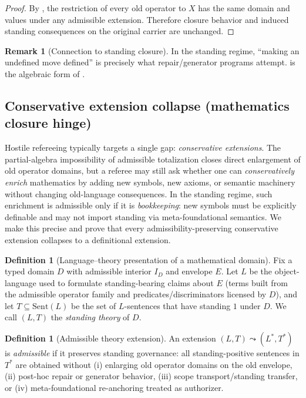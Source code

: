 \documentclass[11pt]{article}
\theoremstyle{definition}
\newtheorem{definition}[theorem]{Definition}
\newtheorem{remark}[theorem]{Remark}
\begin{document}
\begin{proof}
By , the restriction of every old operator to $X$ has the same domain and values under any admissible extension.
Therefore closure behavior and induced standing consequences on the original carrier are unchanged.
\end{proof}

\begin{remark}[Connection to standing closure]
In the standing regime, ``making an undefined move defined'' is precisely what repair/generator programs attempt.
 is the algebraic form of .
\end{remark}

\subsection{Conservative extension collapse (mathematics closure hinge)}
\label{sec:conservative}

Hostile refereeing typically targets a single gap: \emph{conservative extensions}.
The partial-algebra impossibility of admissible totalization closes direct enlargement of old operator domains, but a referee may still ask whether one can \emph{conservatively enrich} mathematics by adding new symbols, new axioms, or semantic machinery without changing old-language consequences.
In the standing regime, such enrichment is admissible only if it is \emph{bookkeeping}: new symbols must be explicitly definable and may not import standing via meta-foundational semantics.
We make this precise and prove that every admissibility-preserving conservative extension collapses to a definitional extension.

\begin{definition}[Language--theory presentation of a mathematical domain]
Fix a typed domain $D$ with admissible interior $I_D$ and envelope $E$.
Let $L$ be the object-language used to formulate standing-bearing claims about $E$ (terms built from the admissible operator family and predicates/discriminators licensed by $D$), and let
$T\subseteq \mathrm{Sent}(L)$ be the set of $L$-sentences that have standing $1$ under $D$.
We call $(L,T)$ the \emph{standing theory} of $D$.
\end{definition}

\begin{definition}[Admissible theory extension]
An extension $(L,T)\leadsto (L^*,T^*)$ is \emph{admissible} if it preserves standing governance: all standing-positive sentences in $T^*$ are obtained without
(i) enlarging old operator domains on the old envelope,
(ii) post-hoc repair or generator behavior,
(iii) scope transport/standing transfer, or
(iv) meta-foundational re-anchoring treated as authorizer.
\end{definition}
\end{document}
